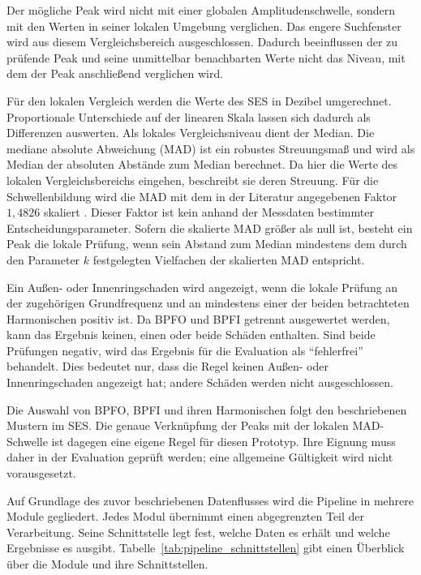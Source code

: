 Der mögliche Peak wird nicht mit einer globalen Amplitudenschwelle, sondern mit
den Werten in seiner lokalen Umgebung verglichen. Das engere Suchfenster wird
aus diesem Vergleichsbereich ausgeschlossen. Dadurch beeinflussen der zu
prüfende Peak und seine unmittelbar benachbarten Werte nicht das Niveau, mit
dem der Peak anschließend verglichen wird.

Für den lokalen Vergleich werden die Werte des \acrshort{SES} in Dezibel
umgerechnet. Proportionale Unterschiede auf der linearen Skala lassen sich
dadurch als Differenzen auswerten. Als lokales Vergleichsniveau dient der
Median. Die mediane absolute Abweichung (MAD) ist ein robustes Streuungsmaß
und wird als Median der absoluten Abstände zum Median berechnet. Da hier die
Werte des lokalen Vergleichsbereichs eingehen, beschreibt sie deren Streuung.
Für die Schwellenbildung wird die MAD mit dem in der Literatur angegebenen
Faktor $1{,}4826$ skaliert
\cite[S.~1273, Abschn.~1, Gl.~(1.2)]
{rousseeuwAlternativesMedianAbsolute1993}. Dieser Faktor ist kein anhand der
Messdaten bestimmter Entscheidungsparameter. Sofern die skalierte MAD größer
als null ist, besteht ein Peak die lokale Prüfung, wenn sein Abstand zum
Median mindestens dem durch den Parameter $k$ festgelegten Vielfachen der
skalierten MAD entspricht.

Ein Außen- oder Innenringschaden wird angezeigt, wenn die lokale Prüfung an der
zugehörigen Grundfrequenz und an mindestens einer der beiden betrachteten
Harmonischen positiv ist. Da BPFO und BPFI getrennt ausgewertet werden, kann
das Ergebnis keinen, einen oder beide Schäden enthalten. Sind beide Prüfungen
negativ, wird das Ergebnis für die Evaluation als \enquote{fehlerfrei}
behandelt. Dies bedeutet nur, dass die Regel keinen Außen- oder
Innenringschaden angezeigt hat; andere Schäden werden nicht ausgeschlossen.

Die Auswahl von BPFO, BPFI und ihren Harmonischen folgt den beschriebenen
Mustern im \acrshort{SES}. Die genaue Verknüpfung der Peaks mit der
lokalen MAD-Schwelle ist dagegen eine eigene Regel für diesen Prototyp. Ihre
Eignung muss daher in der Evaluation geprüft werden; eine allgemeine Gültigkeit
wird nicht vorausgesetzt.


Auf Grundlage des zuvor beschriebenen Datenflusses wird die Pipeline in
mehrere Module gegliedert. Jedes Modul übernimmt einen abgegrenzten Teil der
Verarbeitung. Seine Schnittstelle legt fest, welche Daten es erhält und welche
Ergebnisse es ausgibt. Tabelle~\ref{tab:pipeline_schnittstellen} gibt einen
Überblick über die Module und ihre Schnittstellen.


